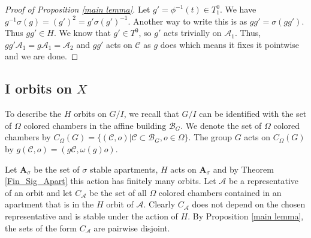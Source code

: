 \documentclass[12pt]{article}
\newcommand{\N}{\mathbb{N}}
\newcommand{\A}{\mathcal{A}}
\newcommand{\B}{\mathcal{B}}
\newcommand{\C}{\mathcal{C}}
\newcommand{\s}{\mathcal{O}}
\newcommand{\<}{\langle}
\renewcommand{\>}{\rangle}
\theoremstyle{plain}
\theoremstyle{definition}
\begin{document}
\begin{proof}[Proof of Proposition \ref{main lemma}]
 
 Let $g'=\phi^{-1}(t)\in T_1^0$. We have $g^{-1}\sigma(g)=(g')^2=g'\sigma(g')^{-1}$. Another way to write this is as $gg'=\sigma(gg')$. Thus $gg'\in H$. We know that $g'\in T^0$, so $g'$ acts trivially on $\A_1$. Thus, $gg'\A_1=g\A_1=\A_2$ and $gg'$ acts on $\C$ as $g$ does which means it fixes it pointwise and we are done.
 



\end{proof}

\subsection{I orbits on $X$}

To describe the $H$ orbits on $G/I$, we recall that $G/I$ can be identified with the set of $\Omega$ colored chambers in the affine building $\B_G$. We denote the set of $\Omega$ colored chambers by $C_\Omega(G)=\{(\C,o)|\C\subset\B_G,o\in\Omega\}$. The group $G$ acts on $C_\Omega(G)$ by $g(\C,o)=(g\C,\omega(g)o)$.

Let $\mathbf{A}_\sigma$ be the set of $\sigma$ stable apartments, $H$ acts on $\mathbf{A}_\sigma$ and by Theorem \ref{Fin_Sig_Apart} this action has finitely many orbits. Let $\A$ be a representative of an orbit and let $C_\A$ be the set of all $\Omega$ colored chambers contained in an apartment that is in the $H$ orbit of $\A$. Clearly $C_\A$ does not depend on the chosen representative and is stable under the action of $H$. By Proposition \ref{main lemma}, the sets of the form $C_\A$ are pairwise disjoint.
\end{document}
